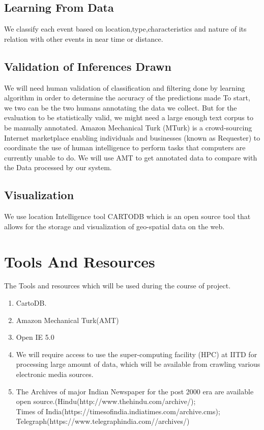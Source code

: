 \documentclass[a4paper,11pt]{article}
\begin{document}
\subsection{Learning From Data}
We classify each event based on location,type,characteristics and nature of its relation with other events in near time or distance.

\subsection{Validation of Inferences Drawn}
 We will need human validation of classification and filtering done by learning algorithm in order to determine the accuracy of the predictions made To start, we two can be the two humans annotating the data we collect. But for the evaluation to be statistically valid, we might need a large enough text corpus to be manually annotated. Amazon Mechanical Turk (MTurk) is a crowd-sourcing Internet marketplace enabling individuals and businesses (known as Requester) to coordinate the use of human intelligence to perform tasks that computers are currently unable to do. We will use AMT to get annotated data to compare with the Data processed by our system.




\subsection{Visualization}
We use location Intelligence tool CARTODB which is an open source tool that allows for the storage and visualization of geo-spatial data on the web.

\section{Tools And Resources}
The Tools and resources which will be used during the course of project.

\begin{enumerate}
\item{CartoDB}.

\item{Amazon Mechanical Turk(AMT)}

\item{Open IE 5.0}

\item{We will require access to use the super-computing facility (HPC) at IITD for processing large amount of data, which will be available from crawling various electronic media sources.}

\item{The Archives of major Indian Newspaper for the post 2000 era are available open source.(Hindu(http://www.thehindu.com/archive/);\\Times of India(https://timesofindia.indiatimes.com/archive.cms);\\Telegraph(https://www.telegraphindia.com//archives/)}
\end{enumerate}
\end{document}
